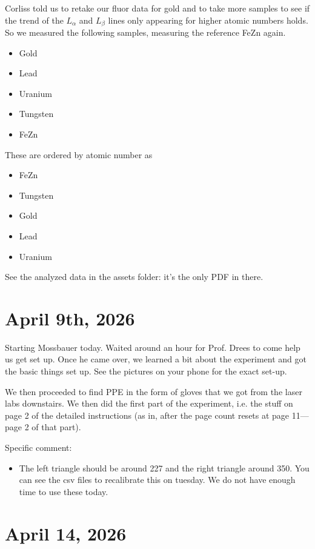 \documentclass[11pt]{article}
\begin{document}
Corliss told us to retake our fluor data for gold
and to take more samples to see if the trend of
the $L_\alpha$ and $L_\beta$ lines only appearing for
higher atomic numbers holds. So we measured the following
samples, measuring the reference FeZn again.
\begin{itemize}
    \item Gold
    \item Lead
    \item Uranium
    \item Tungsten
    \item FeZn
\end{itemize}

These are ordered by atomic number as

\begin{itemize}
    \item FeZn
    \item Tungsten
    \item Gold
    \item Lead
    \item Uranium
\end{itemize}

See the analyzed data in the assets folder: it's the
only PDF in there.

\section{April 9th, 2026}

Starting Mossbauer today. Waited around an hour for Prof. Drees
to come help us get set up. Once he came over, we learned a bit
about the experiment and got the basic things set up. See the
pictures on your phone for the exact set-up.

We then proceeded to find PPE in the form of gloves that we got from
the laser labs downstairs. We then did the first part of the experiment,
i.e. the stuff on page 2 of the detailed instructions (as in, after the
page count resets at page 11---page 2 of that part).

Specific comment:
\begin{itemize}
    \item The left triangle should be around 227 and the right triangle around 350.
    You can see the csv files to recalibrate this on tuesday. We do not
    have enough time to use these today.
\end{itemize}

\section{April 14, 2026}
\end{document}
